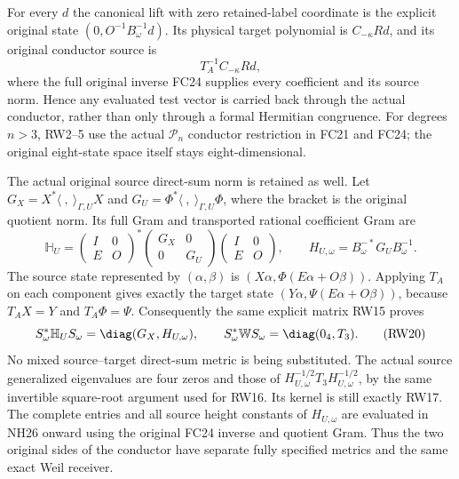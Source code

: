 For every $d$ the canonical lift with zero retained-label
coordinate is the explicit original state
$(0,O^{-1}B_\omega^{-1}d)$. Its physical target polynomial is
$C_{-\kappa}Rd$, and its original conductor source is
\[
 T_A^{-1}C_{-\kappa}Rd,
 \tag{RW18}
\]
where the full original inverse FC24 supplies every coefficient
and its source norm. Hence any evaluated test vector is carried
back through the actual conductor, rather than only through a
formal Hermitian congruence. For degrees $n>3$, RW2--5 use the
actual $\mathcal P_n$ conductor restriction in FC21 and FC24;
the original eight-state space itself stays eight-dimensional.

The actual original source direct-sum norm is retained as well.
Let $G_X=X^*\langle\ ,\ \rangle_{\Gamma,U}X$ and
$G_U=\Phi^*\langle\ ,\ \rangle_{\Gamma,U}\Phi$, where the
bracket is the original quotient norm. Its full Gram and
transported rational coefficient Gram are
\[
 \mathbb H_U=
 \begin{pmatrix}I&0\\E&O\end{pmatrix}^{\!*}
 \begin{pmatrix}G_X&0\\0&G_U\end{pmatrix}
 \begin{pmatrix}I&0\\E&O\end{pmatrix},\qquad
 H_{U,\omega}=B_\omega^{-*}G_UB_\omega^{-1}.
 \tag{RW19}
\]
The source state represented by $(\alpha,\beta)$ is
$(X\alpha,\Phi(E\alpha+O\beta))$. Applying $T_A$ on
each component gives exactly the target state
$(Y\alpha,\Psi(E\alpha+O\beta))$, because
$T_AX=Y$ and $T_A\Phi=\Psi$.
Consequently the same explicit matrix RW15 proves
\[
 S_\omega^*\mathbb H_U S_\omega=\diag(G_X,H_{U,\omega}),
 \qquad
 S_\omega^*\mathbb W S_\omega=\diag(0_4,T_3).
 \tag{RW20}
\]
No mixed source--target direct-sum metric is being substituted.
The actual source generalized eigenvalues are four zeros and
those of $H_{U,\omega}^{-1/2}T_3H_{U,\omega}^{-1/2}$, by
the same invertible square-root argument used for RW16.
Its kernel is still exactly RW17. The complete entries and
all source height constants of $H_{U,\omega}$ are evaluated
in NH26 onward using the original FC24 inverse and quotient
Gram. Thus the two original sides of the conductor have
separate fully specified metrics and the same exact Weil receiver.
